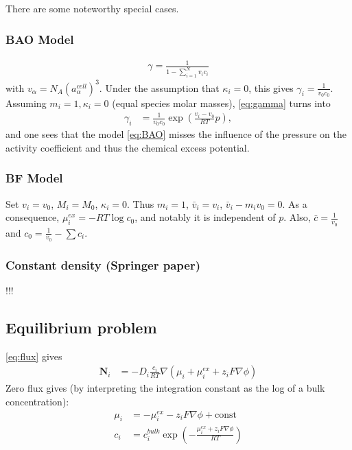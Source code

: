 \documentclass[12pt,oneside,reqno]{amsart}
\numberwithin{equation}{section}
\begin{document}
There are some noteworthy special cases.

\subsubsection{BAO Model}
\cite{Borukhov, Andelman, Orland, RingeEtAl}
\begin{align}
  \gamma = \frac{1}{1-\sum_{i=1}^N v_i c_i} \label{eq:BAO}
\end{align}
with $v_\alpha = N_A (a_\alpha^{cell})^3$. Under the assumption that $\kappa_i=0$, this gives
$\gamma_i = \frac{1}{v_0 c_0}$. Assuming $m_i=1, \kappa_i=0$  (equal species molar masses),  
\eqref{eq:gamma} turns into
\begin{align}
  \gamma_i
         &= \frac{1}{v_0c_0}\exp\left(\frac{v_i-v_0}{RT}p\right),
\end{align}
and one sees that the model \eqref{eq:BAO} misses the influence of the pressure on the
activity coefficient and thus the chemical excess potential.


\subsubsection{BF Model}
\cite{Fuhrmann2015}
Set $v_i=v_0$, $M_i=M_0$, $\kappa_i=0$. Thus $m_i=1$, $\bar v_i=v_i$, $\bar v_i -m_i v_0=0$.
As a consequence, $\mu_i^{ex} = -RT\log c_0$, and notably it is independent of $p$.
Also, $\bar c=\frac{1}{v_0}$ and $c_0=\frac{1}{v_0} - \sum c_i$.



\clearpage
\subsubsection{Constant density (Springer paper)}!!!


\subsection{Equilibrium problem}
\eqref{eq:flux} gives
\begin{align}\label{eq:fluxx}
  \mathbf N_i &= - D_i\frac{c_i}{RT}\nabla\left( \mu_i +  \mu_i^{ex} + z_i F \nabla \phi \right)
\end{align}
Zero flux gives (by interpreting the integration constant as the log of a bulk concentration):
\begin{align}
  \mu_i   &=   - \mu_i^{ex} - z_i F \nabla \phi + \text{const}\\
  c_i   &=  c_i^{bulk}\exp\left( -\frac{\mu_i^{ex} + z_i F \nabla \phi}{RT}\right) 
\end{align}
\end{document}
